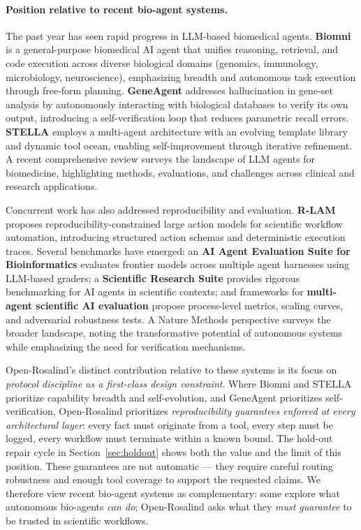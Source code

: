 \documentclass[11pt,letterpaper]{article}
\begin{document}
\paragraph{Position relative to recent bio-agent systems.}
The past year has seen rapid progress in LLM-based biomedical agents. \textbf{Biomni} \cite{huang2025biomni} is a general-purpose biomedical AI agent that unifies reasoning, retrieval, and code execution across diverse biological domains (genomics, immunology, microbiology, neuroscience), emphasizing breadth and autonomous task execution through free-form planning. \textbf{GeneAgent} \cite{geneagent2025} addresses hallucination in gene-set analysis by autonomously interacting with biological databases to verify its own output, introducing a self-verification loop that reduces parametric recall errors. \textbf{STELLA} \cite{stella2025} employs a multi-agent architecture with an evolving template library and dynamic tool ocean, enabling self-improvement through iterative refinement. A recent comprehensive review \cite{llmagents2025biomedicine} surveys the landscape of LLM agents for biomedicine, highlighting methods, evaluations, and challenges across clinical and research applications.

Concurrent work has also addressed reproducibility and evaluation. \textbf{R-LAM} \cite{rlam2025} proposes reproducibility-constrained large action models for scientific workflow automation, introducing structured action schemas and deterministic execution traces. Several benchmarks have emerged: an \textbf{AI Agent Evaluation Suite for Bioinformatics} \cite{bioagenteval2025} evaluates frontier models across multiple agent harnesses using LLM-based graders; a \textbf{Scientific Research Suite} \cite{sciresearch2025} provides rigorous benchmarking for AI agents in scientific contexts; and frameworks for \textbf{multi-agent scientific AI evaluation} \cite{multiagenteval2026} propose process-level metrics, scaling curves, and adversarial robustness tests. A Nature Methods perspective \cite{naturemethods2025agents} surveys the broader landscape, noting the transformative potential of autonomous systems while emphasizing the need for verification mechanisms.

Open-Rosalind's distinct contribution relative to these systems is its focus on \emph{protocol discipline as a first-class design constraint}. Where Biomni and STELLA prioritize capability breadth and self-evolution, and GeneAgent prioritizes self-verification, Open-Rosalind prioritizes \emph{reproducibility guarantees enforced at every architectural layer}: every fact must originate from a tool, every step must be logged, every workflow must terminate within a known bound. The hold-out repair cycle in Section~\ref{sec:holdout} shows both the value and the limit of this position. These guarantees are not automatic --- they require careful routing robustness and enough tool coverage to support the requested claims. We therefore view recent bio-agent systems as complementary: some explore what autonomous bio-agents \emph{can do}; Open-Rosalind asks what they \emph{must guarantee} to be trusted in scientific workflows.
\end{document}
